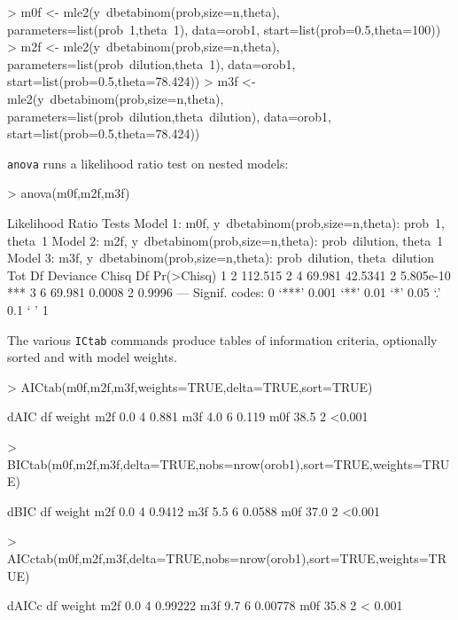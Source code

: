 \documentclass{article}
\newcommand{\code}[1]{{\tt #1}}
\begin{document}
\begin{Schunk}
\begin{Sinput}
> m0f <- mle2(y~dbetabinom(prob,size=n,theta),
             parameters=list(prob~1,theta~1),
             data=orob1,
             start=list(prob=0.5,theta=100))
> m2f <- mle2(y~dbetabinom(prob,size=n,theta),
             parameters=list(prob~dilution,theta~1),
             data=orob1,
             start=list(prob=0.5,theta=78.424))
> m3f <- mle2(y~dbetabinom(prob,size=n,theta),
             parameters=list(prob~dilution,theta~dilution),
             data=orob1,
             start=list(prob=0.5,theta=78.424))
\end{Sinput}
\end{Schunk}

\code{anova} runs a likelihood ratio test on nested
models:
\begin{Schunk}
\begin{Sinput}
> anova(m0f,m2f,m3f)
\end{Sinput}
\begin{Soutput}
Likelihood Ratio Tests
Model 1: m0f, y~dbetabinom(prob,size=n,theta): prob~1, theta~1
Model 2: m2f, y~dbetabinom(prob,size=n,theta): prob~dilution, theta~1
Model 3: m3f, y~dbetabinom(prob,size=n,theta): prob~dilution,
          theta~dilution
  Tot Df Deviance   Chisq Df Pr(>Chisq)    
1      2  112.515                          
2      4   69.981 42.5341  2  5.805e-10 ***
3      6   69.981  0.0008  2     0.9996    
---
Signif. codes:  0 ‘***’ 0.001 ‘**’ 0.01 ‘*’ 0.05 ‘.’ 0.1 ‘ ’ 1 
\end{Soutput}
\end{Schunk}

The various \code{ICtab} commands produce tables of
information criteria, optionally sorted and
with model weights.
\begin{Schunk}
\begin{Sinput}
> AICtab(m0f,m2f,m3f,weights=TRUE,delta=TRUE,sort=TRUE)
\end{Sinput}
\begin{Soutput}
    dAIC df weight
m2f  0.0 4  0.881 
m3f  4.0 6  0.119 
m0f 38.5 2  <0.001
\end{Soutput}
\begin{Sinput}
> BICtab(m0f,m2f,m3f,delta=TRUE,nobs=nrow(orob1),sort=TRUE,weights=TRUE)
\end{Sinput}
\begin{Soutput}
    dBIC df weight
m2f  0.0 4  0.9412
m3f  5.5 6  0.0588
m0f 37.0 2  <0.001
\end{Soutput}
\begin{Sinput}
> AICctab(m0f,m2f,m3f,delta=TRUE,nobs=nrow(orob1),sort=TRUE,weights=TRUE)
\end{Sinput}
\begin{Soutput}
    dAICc df weight 
m2f  0.0  4  0.99222
m3f  9.7  6  0.00778
m0f 35.8  2  < 0.001
\end{Soutput}
\end{Schunk}
\end{document}
